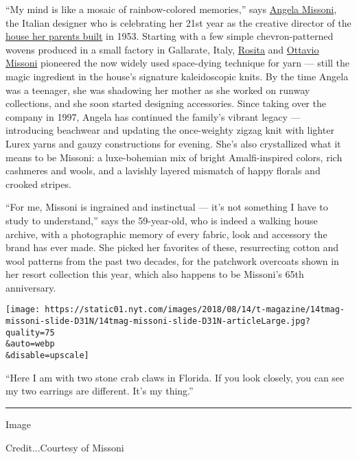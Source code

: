 ``My mind is like a mosaic of rainbow-colored memories,'' says
\href{https://www.nytimes.com/2017/09/25/t-magazine/fashion/angela-missoni-milan-fashion-week.html}{Angela
Missoni}, the Italian designer who is celebrating her 21st year as the
creative director of the
\href{https://www.nytimes.com/slideshow/2018/02/24/fashion/runway-womens/missoni-m-w-fall-2018.html}{house
her parents built} in 1953. Starting with a few simple chevron-patterned
wovens produced in a small factory in Gallarate, Italy,
\href{https://www.nytimes.com/2017/07/11/t-magazine/rosita-missoni-garden-home.html}{Rosita}
and
\href{https://www.nytimes.com/2013/05/10/fashion/ottavio-missoni-is-dead-at-92.html}{Ottavio
Missoni} pioneered the now widely used space-dying technique for yarn
--- still the magic ingredient in the house's signature kaleidoscopic
knits. By the time Angela was a teenager, she was shadowing her mother
as she worked on runway collections, and she soon started designing
accessories. Since taking over the company in 1997, Angela has continued
the family's vibrant legacy --- introducing beachwear and updating the
once-weighty zigzag knit with lighter Lurex yarns and gauzy
constructions for evening. She's also crystallized what it means to be
Missoni: a luxe-bohemian mix of bright Amalfi-inspired colors, rich
cashmeres and wools, and a lavishly layered mismatch of happy florals
and crooked stripes.

``For me, Missoni is ingrained and instinctual --- it's not something I
have to study to understand,'' says the 59-year-old, who is indeed a
walking house archive, with a photographic memory of every fabric, look
and accessory the brand has ever made. She picked her favorites of
these, resurrecting cotton and wool patterns from the past two decades,
for the patchwork overcoats shown in her resort collection this year,
which also happens to be Missoni's 65th anniversary.

\texttt{[image: https://static01.nyt.com/images/2018/08/14/t-magazine/14tmag-missoni-slide-D31N/14tmag-missoni-slide-D31N-articleLarge.jpg?quality=75\\\&auto=webp\\\&disable=upscale]}

``Here I am with two stone crab claws in Florida. If you look closely,
you can see my two earrings are different. It's my thing.''

\begin{center}\rule{0.5\linewidth}{\linethickness}\end{center}

Image

Credit...Courtesy of Missoni

